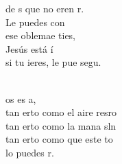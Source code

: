 \documentclass[12pt]{article}
\begin{document}
\begin{multicols*}{2}
\begin{cancion}
	de s que no eren r.\\
	Le puedes con\\
	ese oblemae ties,\\
	Jesús está í\\
	si tu ieres, le pue segu.\\\jump\\
	\begin{chorus}%
	os es a, \\
	tan erto como el aire  resro\\
	tan erto como la mana sln\\
	tan erto como que este to \\
	lo puedes r. \\
	\end{chorus}%
	\jump\\
\end{cancion}%


\end{multicols*}
\end{document}
